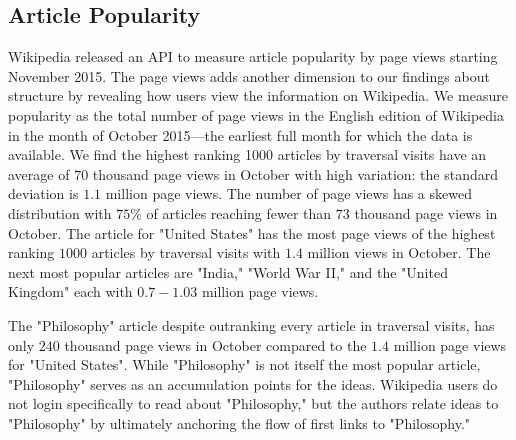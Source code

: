 \documentclass[pre,twocolumn,twoside,superscriptaddress,floatfix, aps, 10pt]{revtex4-1}
\begin{document}
\subsection{Article Popularity}

Wikipedia released an API to measure article popularity by page views
starting November 2015. The page views adds another dimension to our
findings about structure by revealing 
how users view the information on Wikipedia. 
We measure popularity as the total number 
of page views in the English edition of Wikipedia in the month of 
October 2015---the earliest full month for which the data is available. 
We find the highest ranking 1000 articles by traversal visits have an average of
$70$ thousand page views in October with high variation: the standard deviation 
is $1.1$ million page views. 
The number of page views has a skewed distribution with $75\%$ of articles
reaching fewer than $73$ thousand page views in October.
The article for "United States" has the most page 
views of the highest ranking $1000$ articles by traversal visits with 
$1.4$ million views in October. The next most popular articles are 
"India," "World War II," and the "United Kingdom" each with $0.7-1.03$ million page views. 


The "Philosophy" article despite outranking every article in traversal visits,
has only $240$ thousand page views in October compared to the $1.4$ million
page views for "United States".
While "Philosophy" is not itself the most popular article, "Philosophy" serves as 
an accumulation points for the ideas. Wikipedia users do not login specifically
to read about "Philosophy," but the authors relate ideas to "Philosophy" 
by ultimately anchoring the flow of first links to "Philosophy."
\end{document}
